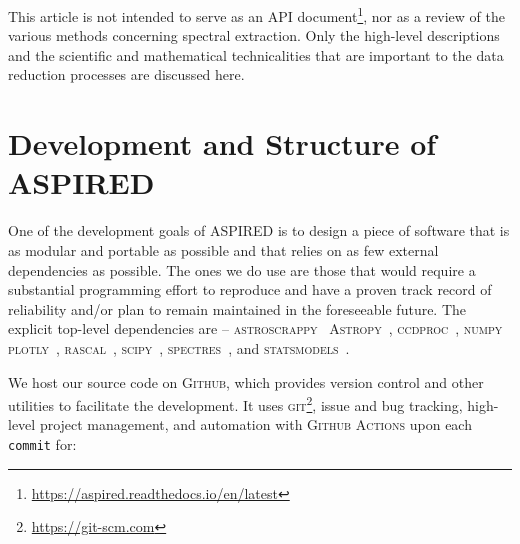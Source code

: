 \documentclass[linenumbers, twocolumn]{aastex631}
\begin{document}
This article is not intended to serve as an API document\footnote{\url{https://aspired.readthedocs.io/en/latest}\label{rtd}}, nor as a review of the
various methods concerning spectral extraction. Only the high-level
descriptions and the scientific and mathematical technicalities that are
important to the data reduction processes are discussed here.

\section{Development and Structure of \textsc{ASPIRED}}
\label{sec:development}

One of the development goals of \textsc{ASPIRED} is to design a piece of software that is as
modular and portable as possible and that relies on as few external dependencies as possible.
The ones we do use are those that would require a substantial programming effort to reproduce and have a
proven track record of reliability and/or plan to remain maintained in the
foreseeable future. The explicit top-level dependencies are --
\textsc{astroscrappy}~\citep{curtis_mccully_2018_1482019, 2001PASP..113.1420V}
\textsc{Astropy}~\citep{astropy:2013, astropy:2018},
\textsc{ccdproc}~\citep{matt_craig_2017_1069648},
\textsc{numpy}~\citep{2020NumPy-Array}
\textsc{plotly}~\citep{plotly},
\textsc{rascal}~\citep{2020ASPC..527..627V},
\textsc{scipy}~\citep{2020SciPy-NMeth},
\textsc{spectres}~\citep{2017arXiv170505165C}, and
\textsc{statsmodels}~\citep{seabold2010statsmodels}. 

We host our source code on \textsc{Github}, which provides version control and other
utilities to facilitate the development. It uses \textsc{git}\footnote{\url{https://git-scm.com}},
issue and bug tracking, high-level project management, and automation with \textsc{Github Actions}
upon each \texttt{commit} for:
\end{document}
